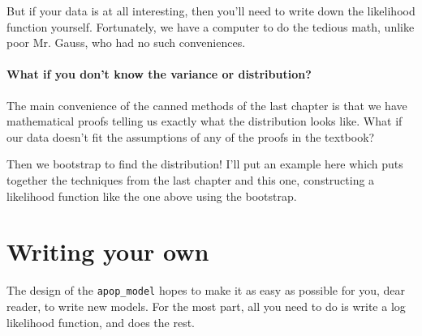 But if your data is at all interesting, then you'll need to write down
the likelihood function yourself.  Fortunately, we have a computer to
do the tedious math, unlike poor Mr. Gauss, who had no such conveniences.


\paragraph{What if you don't know the variance or distribution?} The main convenience of the canned methods of the last
chapter is that we have mathematical proofs telling us exactly what the distribution looks like. What if
our data doesn't fit the assumptions of any of the proofs in the textbook?

Then we bootstrap to find the distribution! I'll put an example here which puts together the techniques
from the last chapter and this one, constructing a likelihood function like the one above using the
bootstrap.

\section{Writing your own}
The design of the {\tt apop\_\-model} hopes to make it as easy as possible for you,
dear reader, to write new models. For the most part, all you need to
do is write a log likelihood function, and 
does the rest.


